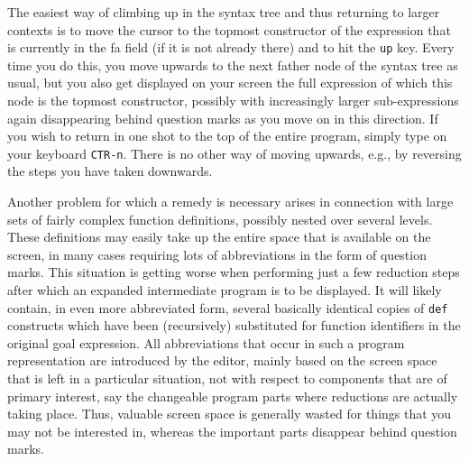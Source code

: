 The easiest way of {\mys climbing up} in the syntax tree and thus returning
to larger contexts is to move the cursor to the topmost constructor of the expression that
is currently in  the {\sc fa} field (if it is not already there) and to hit the {\tt up} key.  Every time you do this,
you move upwards to the next father node of the syntax tree as usual,  but you also
 get displayed on your screen the full
expression of which this node is the topmost constructor, possibly with increasingly  larger
 sub-expressions again  disappearing behind question marks as you move on in this direction.
If you wish to return in one shot to the top of the entire program, simply type
on your keyboard {\tt CTR-n}. There is no other way of moving upwards, e.g.,
by reversing the steps you have taken downwards. 

Another problem for which a remedy is necessary arises in connection with large sets of 
fairly complex {\mys function definitions}, possibly nested over several levels. 
These definitions may easily take up the entire space that is available on the screen, 
in many cases requiring lots of abbreviations in the form of question marks. This situation is
getting worse when performing just a few reduction steps after which an expanded intermediate
program is to be displayed. It will likely contain, in even more abbreviated form,
 several basically identical copies of
{\tt def} constructs which have been (recursively) substituted for function identifiers in
 the original goal expression. All abbreviations that occur in such a
program representation are introduced by the
editor, mainly based on the screen space that is left in a particular situation, not
with respect to components that are of primary interest, say
 the changeable program parts where reductions are actually 
taking place. Thus, valuable screen space   is generally  wasted for things that you
may not be interested in, whereas the important parts disappear behind question marks.
 
